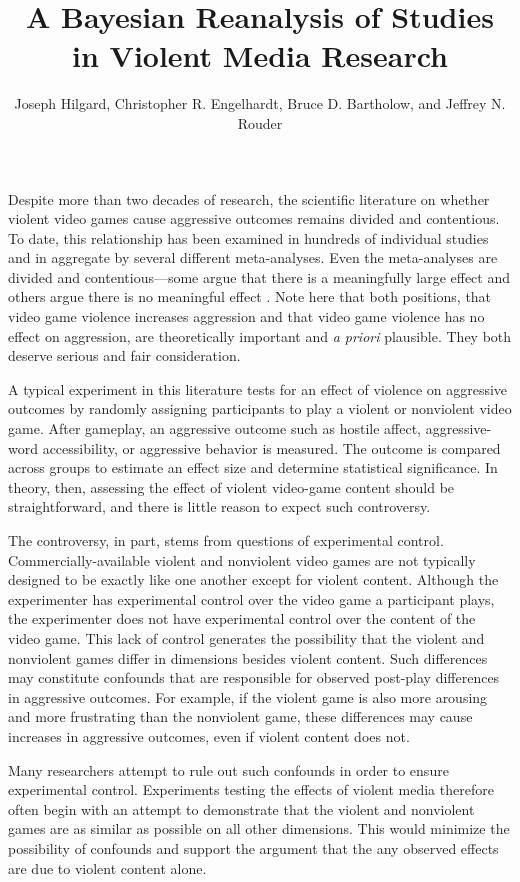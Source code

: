 \documentclass[man]{apa6}
\author{Joseph Hilgard, Christopher R. Engelhardt, Bruce D. Bartholow, and Jeffrey N. Rouder}
\title{A Bayesian Reanalysis of Studies in Violent Media Research}
\affiliation{University of Missouri - Columbia}
\begin{document}
\maketitle

Despite more than two decades of research, the scientific literature on whether violent video games cause aggressive outcomes remains divided and contentious. To date, this relationship has been examined in hundreds of individual studies and in aggregate by several different meta-analyses. Even the meta-analyses are divided and contentious---some argue that there is a meaningfully large effect \citep{Anderson:etal:2010,Greitemeyer:Mugge:2014} and others argue there is no meaningful effect \citep[e.g.,][]{Ferguson:Kilburn:2009,Sherry:2001}. Note here that both positions, that video game violence increases aggression and that video game violence has no effect on aggression, are theoretically important and {\em a priori} plausible.  They both deserve serious and fair consideration. 

A typical experiment in this literature tests for an effect of violence on aggressive outcomes by randomly assigning participants to play a violent or nonviolent video game. After gameplay, an aggressive outcome such as hostile affect, aggressive-word accessibility, or aggressive behavior is measured. The outcome is compared across groups to estimate an effect size and determine statistical significance.  In theory, then, assessing the effect of violent video-game content should be straightforward, and there is little reason to expect such controversy.

The controversy, in part, stems from questions of experimental control.  Commercially-available violent and nonviolent video games are not typically designed to be exactly like one another except for violent content. Although the experimenter has experimental control over the video game a participant plays, the experimenter does not have experimental control over the content of the video game. This lack of control generates the possibility that the violent and nonviolent games differ in dimensions besides violent content. Such differences may constitute confounds that are responsible for observed post-play differences in aggressive outcomes. For example, if the violent game is also more arousing and more frustrating than the nonviolent game, these differences may cause increases in aggressive outcomes, even if violent content does not. 

Many researchers attempt to rule out such confounds in order to ensure experimental control. Experiments testing the effects of violent media therefore often begin with an attempt to demonstrate that the violent and nonviolent games are as similar as possible on all other dimensions. This would minimize the possibility of confounds and support the argument that the any observed effects are due to violent content alone.
\end{document}
